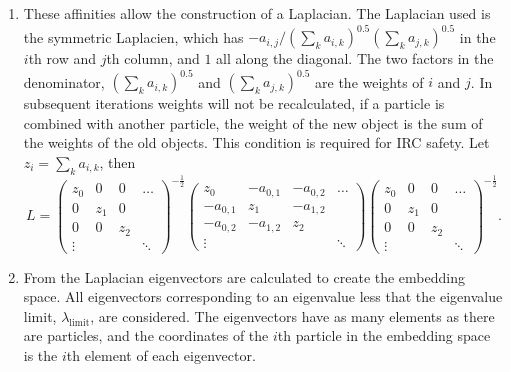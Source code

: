 \begin{enumerate}
\item\label{step:laplacean} These affinities allow the construction of a Laplacian.
        The Laplacian used is the symmetric Laplacien, which has \(-a_{i,j}/(\sum_k a_{i,k})^{0.5}(\sum_k a_{j,k})^{0.5}\)
        in the \(i\)th row and \(j\)th column, and \(1\) all along the diagonal.
        The two factors in the denominator, \((\sum_k a_{i, k})^{0.5}\) and \((\sum_k a_{j, k})^{0.5}\) are the weights of \(i\) and \(j\).
        In subsequent iterations weights will not be recalculated,
        if a particle is combined with another particle, the weight of the new object is the sum of the weights of the old objects.
        This condition is required for IRC safety.
        Let \(z_i = \sum_k a_{i,k}\), then
    \begin{equation}\label{eqn:laplacian}
        L = 
        \begin{pmatrix}
            z_0      & 0   & 0  & \hdots \\
               0     & z_1 &    0     & \\
               0     &    0     & z_2 & \\
            \vdots   &          &     & \ddots 
        \end{pmatrix}^{-\frac{1}{2}}
        \begin{pmatrix}
            z_0 & -a_{0,1} & -a_{0,2} & \hdots \\
            -a_{0,1} & z_1 & -a_{1,2} & \\
            -a_{0,2} & -a_{1,2} & z_2 & \\
            \vdots   &          &     & \ddots 
        \end{pmatrix}
        \begin{pmatrix}
            z_0 &    0     &    0     & \hdots \\
               0     & z_1 &    0     & \\
               0     &    0     & z_2 & \\
            \vdots   &          &     & \ddots 
        \end{pmatrix}^{-\frac{1}{2}}.
    \end{equation}

\item \label{step:eigenvectors} From the Laplacian eigenvectors are calculated to create the embedding space.
            All eigenvectors corresponding to an eigenvalue less that the eigenvalue limit, \(\lambda_\text{limit}\), are considered.
        The eigenvectors have as many elements as there are particles, and the coordinates of
        the \(i\)th particle in the embedding space is the \(i\)th element of each eigenvector.


\end{enumerate}
